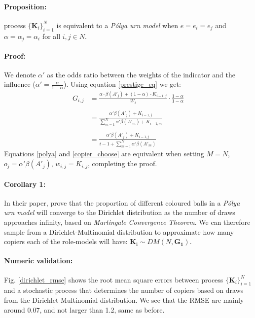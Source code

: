 \documentclass[11pt]{article}
\let\vec\mathbf
\begin{document}
\paragraph{Proposition:} process $\big\{\vec{K}_i\big\}_{i=1}^N$ is equivalent to a \textit{Pólya urn model} when $e=e_i=e_j$ and $\alpha=\alpha_j=\alpha_i$ for all $i,j \in N$.
\paragraph{Proof:} 
We denote $\alpha'$ as the odds ratio between the weights of the indicator and the influence ($\alpha'=\frac{\alpha}{1-\alpha}$). 
Using equation \ref{prestige_eq} we get:
\begin{equation}\label{copier_choose}
\begin{split}
G_{i,j} & = \frac{\alpha\cdot \beta(A'_j) + (1-\alpha) \cdot K_{i-1,j}}{W_i} \cdot \frac{1-\alpha}{1-\alpha} \\\\
&= \frac{\alpha'\beta(A'_j) + K_{i-1,j}}{\sum\limits_{m=1}^{N} \alpha'\beta(A'_m) + K_{i-1,m}}\\\\
& =\frac{\alpha'\beta(A'_j) + K_{i-1,j}}{i-1 + \sum\limits_{m=1}^{N} \alpha'\beta(A'_m)}
\end{split}
\end{equation}
Equations \ref{polya} and \ref{copier_choose} are equivalent when setting $M=N$, $o_j = \alpha'\beta(A'_j)$, $w_{i,j} = K_{i,j}$, completing the proof.

\paragraph{Corollary 1:}
In their paper, \citet[section 2]{dirichlet} prove that the proportion of different coloured balls in a \textit{Pólya urn model} will converge to the Dirichlet distribution as the number of draws approaches infinity, based on \textit{Martingale Convergence Theorem}. 
We can therefore sample from a Dirichlet-Multinomial distribution to approximate how many copiers each of the role-models will have:
$\vec{K_i} \sim DM(N,\vec{G_1})$.

\paragraph{Numeric validation:}
Fig. \ref{dirichlet_rmse} shows the root mean square errors between process $\big\{\vec{K}_i\big\}_{i=1}^N$ and a stochastic process that determines the number of copiers based on draws from the Dirichlet-Multinomial distribution.
We see that the RMSE are mainly around 0.07, and not larger than 1.2, same as before.
\end{document}
